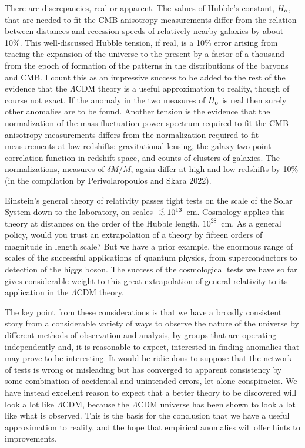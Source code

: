 \documentclass[fleqn,usenatbib]{mnras}
\def\lap{\lower.5ex\hbox{$\; \buildrel < \over \sim \;$}}
\begin{document}
There are discrepancies, real or apparent. The values of Hubble's constant, $H_{\rm o}$, that are needed to fit the CMB anisotropy measurements differ from the relation between distances and recession speeds of relatively nearby galaxies by about 10\%. This well-discussed Hubble tension, if real, is a 10\% error arising from tracing the expansion of the universe to the present by a factor of a thousand from the epoch of formation of the patterns in the distributions of the baryons and CMB. I count this as an impressive success to be added to the rest of the evidence that the $\Lambda$CDM theory is a useful approximation to reality, though of course not exact. If the anomaly in the two measures of $H_{\rm o}$ is real then surely other anomalies are to be found. Another tension is the evidence that  the normalization of the mass fluctuation power spectrum required to fit the CMB anisotropy measurements differs from the normalization required to fit measurements at low redshifts: gravitational lensing, the galaxy two-point correlation function in redshift space, and counts of clusters of galaxies. The normalizations, measures of $\delta M/M$, again differ at high and low redshifts by 10\% (in the compilation by Perivolaropoulos and Skara 2022). 
   
Einstein's general theory of relativity passes tight tests on the scale of the Solar System down to the laboratory, on scales  $\lap 10^{13}$~cm. Cosmology applies this theory at distances on the order of the Hubble length, $10^{28}$~cm. As a general policy, would you trust an extrapolation of a theory by fifteen orders of magnitude in length scale? But we have a prior example, the enormous range of scales of the successful applications of quantum physics, from superconductors to detection of the higgs boson. The success of the cosmological tests we have so far gives considerable weight to this great extrapolation of general relativity to its application in the $\Lambda$CDM theory. 

The key point from these considerations is that we have a broadly consistent story from a considerable variety of ways to observe the nature of the universe by different methods of observation and analysis, by groups that are operating independently and, it is reasonable to expect, interested in finding anomalies that may prove to be interesting. It would be ridiculous to suppose that the network of tests is wrong or misleading but has converged to apparent consistency by some combination of accidental and unintended errors, let alone conspiracies. We have instead excellent reason to expect that a better theory to be discovered will look a lot like $\Lambda$CDM, because the $\Lambda$CDM universe has been shown to look a lot like what is observed. This is the basis for the conclusion that we have a useful approximation to reality, and the hope that empirical anomalies will offer hints to improvements.
\end{document}
